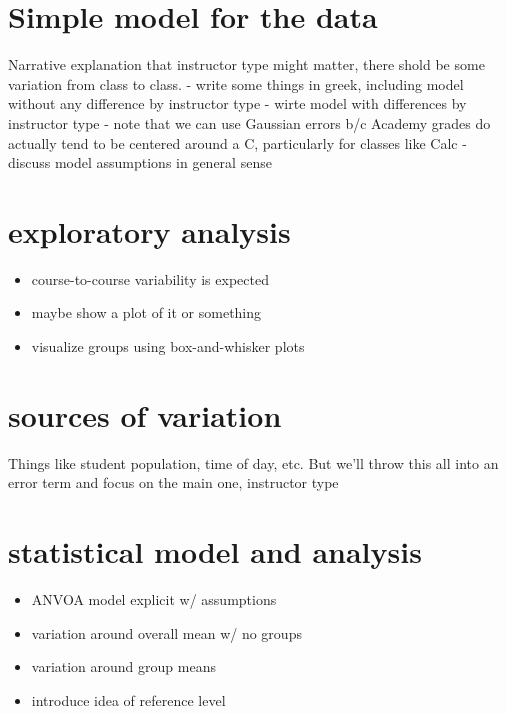 \documentclass[]{book}
\providecommand{\tightlist}{%
  \setlength{\itemsep}{0pt}\setlength{\parskip}{0pt}}
\theoremstyle{definition}
\theoremstyle{definition}
\theoremstyle{definition}
\theoremstyle{remark}
\begin{document}
\chapter{Simple model for the data}\label{simple-model-for-the-data}

Narrative explanation that instructor type might matter, there shold be
some variation from class to class. - write some things in greek,
including model without any difference by instructor type - wirte model
with differences by instructor type - note that we can use Gaussian
errors b/c Academy grades do actually tend to be centered around a C,
particularly for classes like Calc - discuss model assumptions in
general sense

\chapter{exploratory analysis}\label{exploratory-analysis}

\begin{itemize}
\tightlist
\item
  course-to-course variability is expected
\item
  maybe show a plot of it or something
\item
  visualize groups using box-and-whisker plots
\end{itemize}

\chapter{sources of variation}\label{sources-of-variation}

Things like student population, time of day, etc. But we'll throw this
all into an error term and focus on the main one, instructor type

\chapter{statistical model and
analysis}\label{statistical-model-and-analysis}

\begin{itemize}
\tightlist
\item
  ANVOA model explicit w/ assumptions
\item
  variation around overall mean w/ no groups
\item
  variation around group means
\item
  introduce idea of reference level
\end{itemize}
\end{document}
